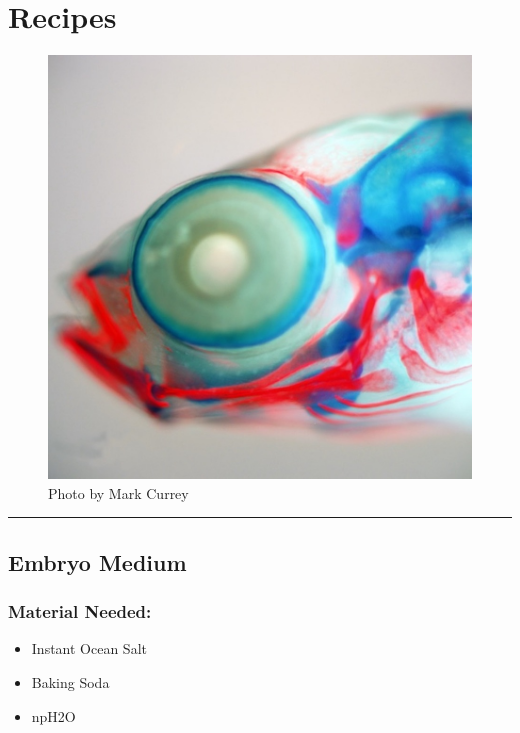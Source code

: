 \documentclass[
]{book}
\providecommand{\tightlist}{%
  \setlength{\itemsep}{0pt}\setlength{\parskip}{0pt}}
\begin{document}
\hypertarget{recipes}{%
\chapter{Recipes}\label{recipes}}

\begin{figure}
\centering
\includegraphics{images/double_head.jpg}
\caption{Photo by Mark Currey}
\end{figure}

\begin{center}\rule{0.5\linewidth}{0.5pt}\end{center}

\hypertarget{embryo-medium}{%
\section{Embryo Medium}\label{embryo-medium}}

\hypertarget{material-needed}{%
\subsection{Material Needed:}\label{material-needed}}

\begin{itemize}
\tightlist
\item
  Instant Ocean Salt
\item
  Baking Soda
\item
  npH2O
\end{itemize}
\end{document}
